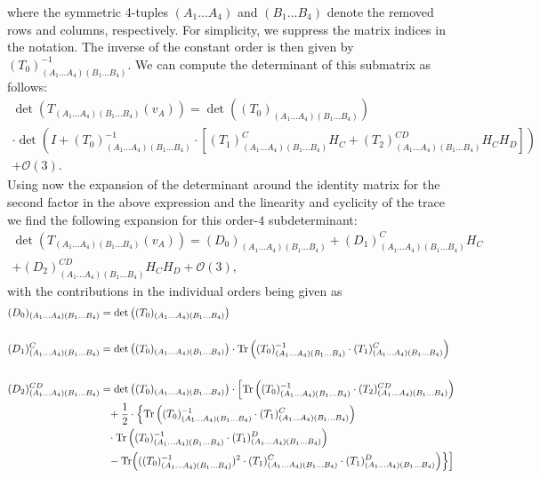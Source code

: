 where the symmetric 4-tuples $(A_1...A_4)$ and $(B_1...B_4)$ denote the removed rows and columns, respectively. For simplicity, we suppress the matrix indices in the notation. The inverse of the constant order is then given by $(T_0)^{-1}_{(A_1...A_4)(B_1...B_4)}$. We can compute the determinant of this submatrix as follows:
\begin{multline}
    \operatorname{det}\left(T_{(A_1...A_4)(B_1...B_4)}(v_A)\right)
    = \operatorname{det}\left((T_0)_{(A_1...A_4)(B_1...B_4)}\right)\\ 
    \cdot \operatorname{det}\left (I +(T_0)^{-1}_{(A_1...A_4)(B_1...B_4)}
    \cdot \left [ (T_1)_{(A_1...A_4)(B_1...B_4)}^{C} H_C+(T_2)_{(A_1...A_4)(B_1...B_4)}^{CD} H_C H_D \right ]  \right ) \\
    + \mathcal{O}(3)  .
\end{multline}
Using now the expansion of the determinant around the identity matrix for the second factor in the above expression and the linearity and cyclicity of the trace we
find the following expansion for this order-$4$ subdeterminant:
\begin{multline}
    \operatorname{det}\left(T_{(A_1...A_4)(B_1...B_4)}(v_A)\right) = (D_0)_{(A_1...A_4)(B_1...B_4)} + (D_1)^C_{(A_1...A_4)(B_1...B_4)}H_C\\
    +(D_2)^{CD}_{(A_1...A_4)(B_1...B_4)}H_CH_D
    + \mathcal{O}(3),
\end{multline}
with the contributions in the individual orders being given as 
\begin{align}\label{polyMatrices}
\begin{aligned}
  (D_0)_{(A_1...A_4)(B_1...B_4)} &=  \operatorname{det}\left((T_0)_{(A_1...A_4)(B_1...B_4)}\right) \\
  \\
  (D_1)^C_{(A_1...A_4)(B_1...B_4)} &= \operatorname{det}\left((T_0)_{(A_1...A_4)(B_1...B_4)}\right) \cdot \operatorname{Tr} \left ( (T_0)^{-1}_{(A_1...A_4)(B_1...B_4)}
    \cdot (T_1)_{(A_1...A_4)(B_1...B_4)}^{C} \right) \\
    \\
    (D_2)^{CD}_{(A_1...A_4)(B_1...B_4)} &= \operatorname{det}\left((T_0)_{(A_1...A_4)(B_1...B_4)}\right)
     \cdot \Bigl [ \operatorname{Tr} \left ( (T_0)^{-1}_{(A_1...A_4)(B_1...B_4)}
    \cdot (T_2)_{(A_1...A_4)(B_1...B_4)}^{CD} \right ) \\
     &\hphantom{=}
    + \frac{1}{2} \cdot \Bigl \{ \operatorname{Tr}\left ( (T_0)^{-1}_{(A_1...A_4)(B_1...B_4)} \cdot (T_1)_{(A_1...A_4)(B_1...B_4)}^{C} \right )\\
     &\hphantom{=} \cdot \operatorname{Tr}\left ( (T_0)^{-1}_{(A_1...A_4)(B_1...B_4)} \cdot (T_1)_{(A_1...A_4)(B_1...B_4)}^{D} \right )  \\
      &\hphantom{=} 
    - \operatorname{Tr}\Bigl  (((T_0)^{-1}_{(A_1...A_4)(B_1...B_4)})^2 \cdot (T_1)_{(A_1...A_4)(B_1...B_4)}^{C} \cdot (T_1)_{(A_1...A_4)(B_1...B_4)}^{D}  \Bigr )    \Bigr \} \Bigr ]
    \end{aligned}
\end{align}
